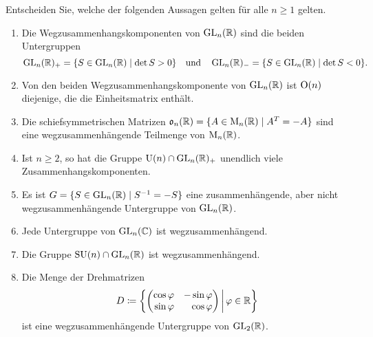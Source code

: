 \begin{question}[subtitle = Multiple Choice zu Wegzusammenhangskomponenten]{1}
  Entscheiden Sie, welche der folgenden Aussagen gelten für alle $n \geq 1$ gelten.
  \begin{enumerate}[leftmargin=*]
    \item
      Die Wegzusammenhangskomponenten von $\operatorname{GL}_n(\mathbb{R})$ sind die beiden Untergruppen
      \[
        \operatorname{GL}_n(\mathbb{R})_+ = \{ S \in \operatorname{GL}_n(\mathbb{R}) \mid \det S > 0 \}
        \quad\text{und}\quad
        \operatorname{GL}_n(\mathbb{R})_- = \{ S \in \operatorname{GL}_n(\mathbb{R}) \mid \det S < 0 \}.
      \]
    \item
      Von den beiden Wegzusammenhangskomponente von $\operatorname{GL}_n(\mathbb{R})$ ist $\operatorname{O}(n)$ diejenige, die die Einheitsmatrix enthält.
    \item
      Die schiefsymmetrischen Matrizen $\mathfrak{o}_n(\mathbb{R}) = \{ A \in \operatorname{M}_n(\mathbb{R}) \mid A^T = -A \}$ sind eine wegzusammenhängende Teilmenge von $\operatorname{M}_n(\mathbb{R})$.
    \item
      Ist $n \geq 2$, so hat die Gruppe $\operatorname{U}(n) \cap \operatorname{GL}_n(\mathbb{R})_+$ unendlich viele Zusammenhangskomponenten.
    \item
      Es ist $G = \{ S \in \operatorname{GL}_n(\mathbb{R}) \mid S^{-1} = -S \}$ eine zusammenhängende, aber nicht wegzusammenhängende Untergruppe von $\operatorname{GL}_n(\mathbb{R})$.
    \item
      Jede Untergruppe von $\operatorname{GL}_n(\mathbb{C})$ ist wegzusammenhängend.
    \item
      Die Gruppe $\operatorname{SU}(n) \cap \operatorname{GL}_n(\mathbb{R})$ ist wegzusammenhängend.
    \item
      Die Menge der Drehmatrizen
      \[
        D
        \coloneqq
        \left\{
          \begin{pmatrix*}[r]
            \cos \varphi  & -\sin \varphi \\
            \sin \varphi  &  \cos \varphi 
          \end{pmatrix*}
        \,\middle|\,
        \varphi \in \Rbb
        \right\}
      \]
      ist eine wegzusammenhängende Untergruppe von $\operatorname{GL}_2(\mathbb{R})$.
  \end{enumerate}
\end{question}
